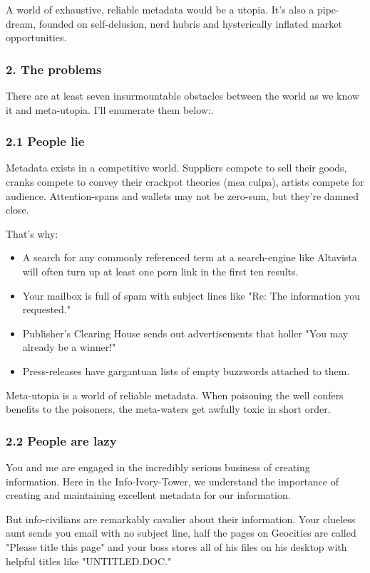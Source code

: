 A world of exhaustive, reliable metadata would be a utopia. It's
also a pipe-dream, founded on self-delusion, nerd hubris and
hysterically inflated market opportunities.

\subsubsection{2. The problems}

There are at least seven insurmountable obstacles between the world
as we know it and meta-utopia. I'll enumerate them below:.

\subsubsection{2.1 People lie}

Metadata exists in a competitive world. Suppliers compete to sell
their goods, cranks compete to convey their crackpot theories (mea
culpa), artists compete for audience. Attention-spans and wallets
may not be zero-sum, but they're damned close.

That's why:

\begin{itemize}
\item
  A search for any commonly referenced term at a search-engine like
  Altavista will often turn up at least one porn link in the first
  ten results.
\item
  Your mailbox is full of spam with subject lines like "Re: The
  information you requested."
\item
  Publisher's Clearing House sends out advertisements that holler
  "You may already be a winner!"
\item
  Press-releases have gargantuan lists of empty buzzwords attached to
  them.
\end{itemize}
Meta-utopia is a world of reliable metadata. When poisoning the
well confers benefits to the poisoners, the meta-waters get awfully
toxic in short order.

\subsubsection{2.2 People are lazy}

You and me are engaged in the incredibly serious business of
creating information. Here in the Info-Ivory-Tower, we understand
the importance of creating and maintaining excellent metadata for
our information.

But info-civilians are remarkably cavalier about their information.
Your clueless aunt sends you email with no subject line, half the
pages on Geocities are called "Please title this page" and your
boss stores all of his files on his desktop with helpful titles
like "UNTITLED.DOC."

